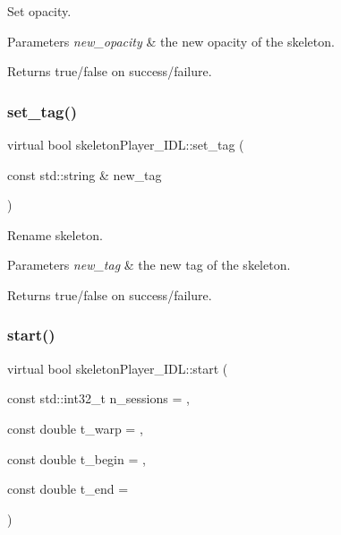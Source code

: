 Set opacity. 


\begin{DoxyParams}{Parameters}
{\em new\+\_\+opacity} & the new opacity of the skeleton. \\
\hline
\end{DoxyParams}
\begin{DoxyReturn}{Returns}
true/false on success/failure. 
\end{DoxyReturn}
\mbox{\label{classskeletonPlayer__IDL_a3a4632867441416e3606b814b5a99fba}} 
\subsubsection{\texorpdfstring{set\+\_\+tag()}{set\_tag()}}
{\footnotesize\ttfamily virtual bool skeleton\+Player\+\_\+\+I\+D\+L\+::set\+\_\+tag (\begin{DoxyParamCaption}\item[{const std\+::string \&}]{new\+\_\+tag }\end{DoxyParamCaption})\hspace{0.3cm}{\ttfamily [virtual]}}



Rename skeleton. 


\begin{DoxyParams}{Parameters}
{\em new\+\_\+tag} & the new tag of the skeleton. \\
\hline
\end{DoxyParams}
\begin{DoxyReturn}{Returns}
true/false on success/failure. 
\end{DoxyReturn}
\mbox{\label{classskeletonPlayer__IDL_a272d9b148696b9ed727c0e6d21894428}} 
\subsubsection{\texorpdfstring{start()}{start()}}
{\footnotesize\ttfamily virtual bool skeleton\+Player\+\_\+\+I\+D\+L\+::start (\begin{DoxyParamCaption}\item[{const std\+::int32\+\_\+t}]{n\+\_\+sessions = {},  }\item[{const double}]{t\+\_\+warp = {},  }\item[{const double}]{t\+\_\+begin = {},  }\item[{const double}]{t\+\_\+end = {} }\end{DoxyParamCaption})\hspace{0.3cm}{\ttfamily [virtual]}}



